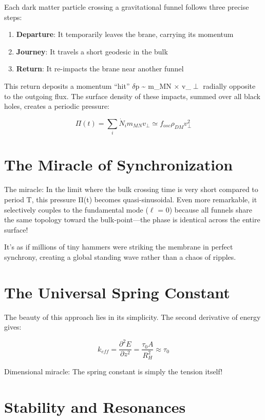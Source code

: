 \documentclass[
  11pt,
]{report}
\providecommand{\tightlist}{%
  \setlength{\itemsep}{0pt}\setlength{\parskip}{0pt}}
\begin{document}
Each dark matter particle crossing a gravitational funnel follows three
precise steps:

\begin{enumerate}
\def\labelenumi{\arabic{enumi}.}
\tightlist
\item
  \textbf{Departure}: It temporarily leaves the brane, carrying its
  momentum
\item
  \textbf{Journey}: It travels a short geodesic in the bulk
\item
  \textbf{Return}: It re-impacts the brane near another funnel
\end{enumerate}

This return deposits a momentum ``hit'' \(\delta\)p \textasciitilde{}
m\_MN × v\_\(\perp\) radially opposite to the outgoing flux. The surface
density of these impacts, summed over all black holes, creates a
periodic pressure:

\[Π(t) = \sum_i \dot{N}_i m_{MN} v_\perp \simeq f_{osc} \rho_{DM} v_\perp^2\]

\section{The Miracle of
Synchronization}\label{the-miracle-of-synchronization}

The miracle: In the limit where the bulk crossing time is very short
compared to period T, this pressure Π(t) becomes quasi-sinusoidal. Even
more remarkable, it selectively couples to the fundamental mode
(\(\ell\) = 0) because all funnels share the same topology toward the
bulk-point---the phase is identical across the entire surface!

It's as if millions of tiny hammers were striking the membrane in
perfect synchrony, creating a global standing wave rather than a chaos
of ripples.

\section{The Universal Spring
Constant}\label{the-universal-spring-constant-1}

The beauty of this approach lies in its simplicity. The second
derivative of energy gives:

\[k_{eff} = \frac{\partial ^2E}{\partial z^2} = \frac{\tau_0 A}{R_H^2} \approx \tau_0\]

Dimensional miracle: The spring constant is simply the tension itself!

\section{Stability and Resonances}\label{stability-and-resonances}
\end{document}
